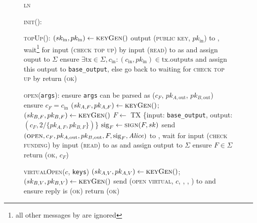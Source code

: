 \begin{figure}[H]
  \begin{systembox}{\textsc{ln}}
    \begin{algorithmic}[1]
      \State \textsc{init}():
      \Indent
        \State \TODO{}
      \EndIndent
      \Statex

      \State \textsc{topUp}(\alice):
      \Indent
        \State $(sk_{\mathrm{in}}, pk_{\mathrm{in}}) \gets \textsc{keyGen}()$
        \State output (\textsc{public key}, $pk_{\mathrm{in}}$) to \alice,
        wait\footnote{all other messages by \alice are ignored} for input
        (\textsc{check top up}) by \alice
        \State input (\textsc{read}) to \ledger as \alice and assign ouput to
        $\Sigma$
        \State ensure $\exists \mathrm{tx} \in \Sigma, c_{\mathrm{in}}:
        (c_{\mathrm{in}}, pk_{\mathrm{in}}) \in \mathrm{tx.outputs}$ and assign
        this output to \texttt{base\_output}, else go back to waiting for
        \textsc{check top up} by \alice
        \State return (\textsc{ok})
      \EndIndent
      \Statex

      \State \textsc{open}(\texttt{args}):
      \Indent
        \State ensure \texttt{args} can be parsed as ($c_F$, $pk_{A,
        \mathrm{out}}$, $pk_{B, \mathrm{out}}$)
        \State ensure $c_F = c_{\mathrm{in}}$
        \State $(sk_{A, F}, pk_{A, F}) \gets \textsc{keyGen}()$; $(sk_{B, F},
        pk_{B, F}) \gets \textsc{keyGen}()$
        \State $F \gets$ TX \{input: \texttt{base\_output}, output: $(c_F,
        2/\{pk_{A, F}, pk_{B, F}\})$\}
        \State $\mathrm{sig}_F \gets \textsc{sign}(F, sk)$
        \State send $(\textsc{open}, c_F, pk_{A, \mathrm{out}}, pk_{B,
        \mathrm{out}}, F, \mathrm{sig}_F, \mathit{Alice})$ to \adversary, wait for
        input (\textsc{check funding}) by \alice
        \State input (\textsc{read}) to \ledger as \alice and assign output to
        $\Sigma$
        \State ensure $F \in \Sigma$
        \State return (\textsc{ok}, $c_F$)
      \EndIndent
      \Statex

      \State \textsc{virtualOpen}($c$, \texttt{keys})
      \Indent
        \State $(sk_{A, V}, pk_{A, V}) \gets \textsc{keyGen}()$; $(sk_{B, V},
        pk_{B, V}) \gets \textsc{keyGen}()$
        \State {}
        \State send (\textsc{open virtual}, $c$, \bob, \charlie, \alice) to
        \adversary and ensure reply is \textsc{(ok)}
        \State return (\textsc{ok})
      \EndIndent
    \end{algorithmic}
  \end{systembox}
  \caption{}
  \label{code:ln}
\end{figure}
